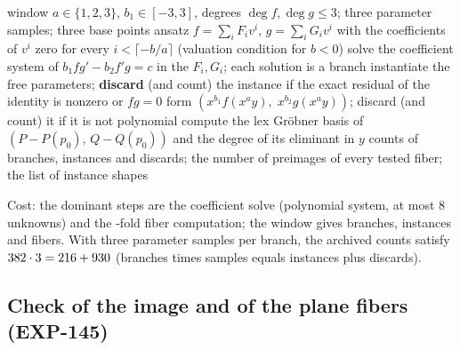 \documentclass[11pt]{article}
\theoremstyle{definition}
\theoremstyle{remark}
\newcommand{\C}{\mathbb{C}}
\begin{document}
\begin{algorithm}[t]
\caption{Branch-symbolic enumeration of equivariant Keller maps of $\C^2$ in a bounded window.}\label{alg:enum}
\begin{algorithmic}[1]
\Require window $a \in \{1,2,3\}$, $b_1 \in [-3,3]$, degrees $\deg f, \deg g \le 3$; three parameter samples; three base points
 \State ansatz $f = \sum_i F_i v^i$, $g = \sum_i G_i v^i$ with the coefficients of $v^i$ zero for every $i < \lceil -b/a \rceil$ (valuation condition for $b < 0$)
 \State solve the coefficient system of $b_1 f g' - b_2 f' g = c$ in the $F_i, G_i$; each solution is a branch
  \State instantiate the free parameters; \textbf{discard} (and count) the instance if the exact residual of the identity is nonzero or $f g = 0$
  \State form $(x^{b_1} f(x^a y),\; x^{b_2} g(x^a y))$; discard (and count) it if it is not polynomial
   compute the lex Gr\"obner basis of $(P - P(p_0),\, Q - Q(p_0))$ and the degree of its eliminant in $y$ \EndFor
 \EndFor
\EndFor
\Ensure counts of branches, instances and discards; the number of preimages of every tested fiber; the list of instance shapes
\end{algorithmic}
\end{algorithm}

Cost: the dominant steps are the coefficient solve (polynomial system, at most $8$ unknowns) and the \numEnumFibers{}-fold fiber computation; the window gives \numBranches{} branches,
\numEnumInst{} instances and \numEnumFibers{} fibers. With three parameter samples per branch, the archived counts satisfy $382 \cdot 3 = 216 + 930$ (branches times samples equals instances plus discards).

\subsection{Check of the image and of the plane fibers (EXP-145)}
\end{document}
